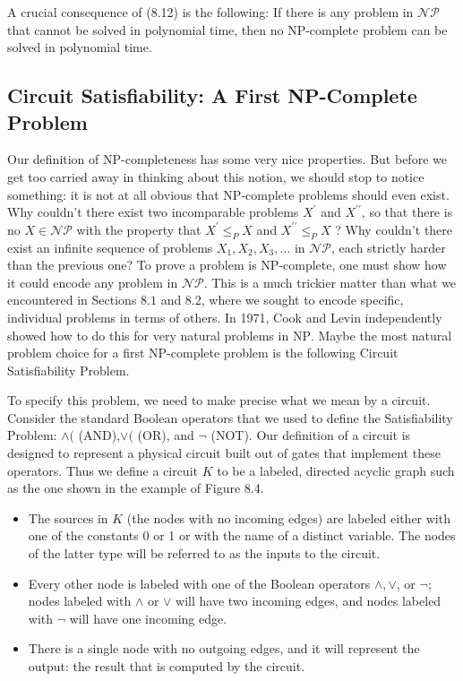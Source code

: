 \documentclass[a4paper, 12pt]{book}
\theoremstyle{dotless}
\begin{document}
A crucial consequence of (8.12) is the following: If there is any problem in $\mathcal{N P}$ that cannot be solved in polynomial time, then no NP-complete problem can be solved in polynomial time.

\subsection{Circuit Satisfiability: A First NP-Complete Problem}
Our definition of NP-completeness has some very nice properties. But before we get too carried away in thinking about this notion, we should stop to notice something: it is not at all obvious that NP-complete problems should even exist. Why couldn't there exist two incomparable problems $X^{\prime}$ and $X^{\prime \prime}$, so that there is no $X \in \mathcal{N P}$ with the property that $X^{\prime} \leq_{P} X$ and $X^{\prime \prime} \leq_{P} X$ ? Why couldn't there exist an infinite sequence of problems $X_{1}, X_{2}, X_{3}, \ldots$ in $\mathcal{N} \mathcal{P}$, each strictly harder than the previous one? To prove a problem is NP-complete, one must show how it could encode any problem in $\mathcal{N P}$. This is a much trickier matter than what we encountered in Sections $8.1$ and 8.2, where we sought to encode specific, individual problems in terms of others. In 1971, Cook and Levin independently showed how to do this for very natural problems in $\mathrm{NP}$. Maybe the most natural problem choice for a first NP-complete problem is the following Circuit Satisfiability Problem.

To specify this problem, we need to make precise what we mean by a circuit. Consider the standard Boolean operators that we used to define the Satisfiability Problem: $\wedge($ (AND),$\vee($ (OR), and $\neg$ (NOT). Our definition of a circuit is designed to represent a physical circuit built out of gates that implement these operators. Thus we define a circuit $K$ to be a labeled, directed acyclic graph such as the one shown in the example of Figure 8.4.

\begin{itemize}
  \item The sources in $K$ (the nodes with no incoming edges) are labeled either with one of the constants 0 or 1 or with the name of a distinct variable. The nodes of the latter type will be referred to as the inputs to the circuit.

  \item Every other node is labeled with one of the Boolean operators $\wedge, \vee$, or $\neg$; nodes labeled with $\wedge$ or $\vee$ will have two incoming edges, and nodes labeled with $\neg$ will have one incoming edge.

  \item There is a single node with no outgoing edges, and it will represent the output: the result that is computed by the circuit.

\end{itemize}
\end{document}
